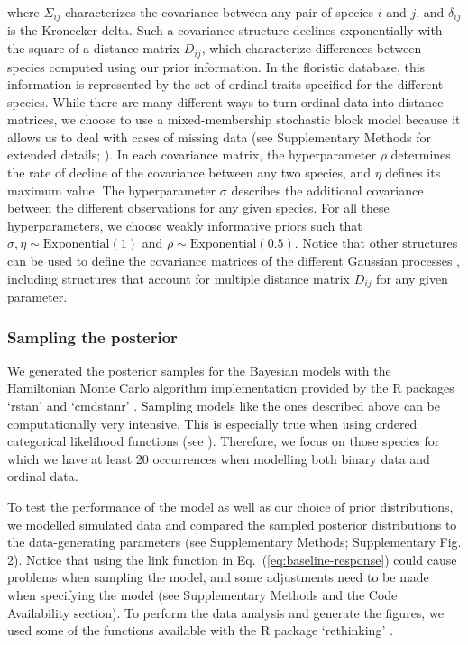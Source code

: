 \documentclass[11pt, a4paper]{article}
\begin{document}
where $\Sigma_{ij}$ characterizes the covariance between any pair of species $i$ and $j$, and $\delta_{ij}$ is the Kronecker delta. Such a covariance structure declines exponentially with the square of a distance matrix $D_{ij}$, which characterize differences between species computed using our prior information. In the floristic database, this information is represented by the set of ordinal traits specified for the different species. While there are many different ways to turn ordinal data into distance matrices, we choose to use a mixed-membership stochastic block model because it allows us to deal with cases of missing data (see Supplementary Methods for extended details; \citealt{godoy-loriteAccurateScalableSocial2016}). In each covariance matrix, the hyperparameter $\rho$ determines the rate of decline of the covariance between any two species, and $\eta$ defines its maximum value. The hyperparameter $\sigma$ describes the additional covariance between the different observations for any given species. For all these hyperparameters, we choose weakly informative priors such that $\sigma , \eta \sim \text{Exponential}\left(1\right)$ and $\rho\sim \text{Exponential}\left(0.5\right)$. Notice that other structures can be used to define the covariance matrices of the different Gaussian processes \citep{mcelreathStatisticalRethinkingBayesian2020}, including structures that account for multiple distance matrix $D_{ij}$ for any given parameter.

\subsubsection*{Sampling the posterior}
We generated the posterior samples for the Bayesian models with the Hamiltonian Monte Carlo algorithm implementation provided by the R packages `rstan' and `cmdstanr' \citep{standevelopentteamRStanInterfaceStan2021}. Sampling models like the ones described above can be computationally very intensive. This is especially true when using ordered categorical likelihood functions (see \citealt{standevelopmentteamStanModelingLanguage2021}). Therefore, we focus on those species for which we have at least 20 occurrences when modelling both binary data and ordinal data.

To test the performance of the model as well as our choice of prior distributions, we modelled simulated data and compared the sampled posterior distributions to the data-generating parameters (see Supplementary Methods; Supplementary Fig. 2). Notice that using the link function in Eq.~(\ref{eq:baseline-response}) could cause problems when sampling the model, and some adjustments need to be made when specifying the model (see Supplementary Methods and the Code Availability section). To perform the data analysis and generate the figures, we used some of the functions available with the R package `rethinking' \citep{mcelreathStatisticalRethinkingBayesian2020}.
\end{document}
